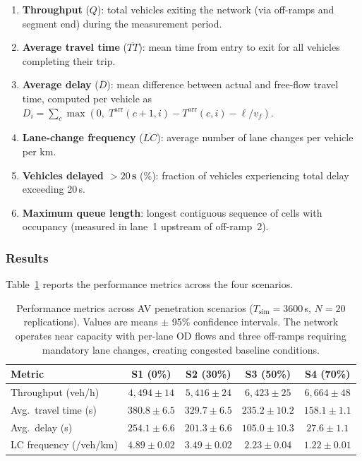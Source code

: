 \documentclass[review,authoryear]{elsarticle}
\newcommand{\Tarr}{T^{\text{arr}}}
\begin{document}
\begin{enumerate}
    \item \textbf{Throughput} ($Q$): total vehicles exiting the network (via off-ramps and segment end) during the measurement period.
    \item \textbf{Average travel time} ($\overline{TT}$): mean time from entry to exit for all vehicles completing their trip.
    \item \textbf{Average delay} ($\overline{D}$): mean difference between actual and free-flow travel time, computed per vehicle as $D_i = \sum_{c} \max(0,\; \Tarr(c+1,i) - \Tarr(c,i) - \ell/v_f)$.
    \item \textbf{Lane-change frequency} ($\overline{LC}$): average number of lane changes per vehicle per km.
    \item \textbf{Vehicles delayed $> 20$\,s} (\%): fraction of vehicles experiencing total delay exceeding 20\,s.
    \item \textbf{Maximum queue length}: longest contiguous sequence of cells with occupancy (measured in lane~1 upstream of off-ramp~2).
\end{enumerate}

\subsubsection{Results}

Table~\ref{tab:results_mixed} reports the performance metrics across the four scenarios.

\begin{table}[ht]
\centering
\caption{Performance metrics across AV penetration scenarios ($T_{\text{sim}} = 3600$\,s, $N = 20$ replications). Values are means $\pm$ 95\% confidence intervals. The network operates near capacity with per-lane OD flows and three off-ramps requiring mandatory lane changes, creating congested baseline conditions.}
\label{tab:results_mixed}
\begin{tabular}{@{}lcccc@{}}
\toprule
Metric & S1 (0\%) & S2 (30\%) & S3 (50\%) & S4 (70\%) \\
\midrule
Throughput (veh/h) & $4{,}494 \pm 14$ & $5{,}416 \pm 24$ & $6{,}423 \pm 25$ & $6{,}664 \pm 48$ \\
Avg.\ travel time (s) & $380.8 \pm 6.5$ & $329.7 \pm 6.5$ & $235.2 \pm 10.2$ & $158.1 \pm 1.1$ \\
Avg.\ delay (s) & $254.1 \pm 6.6$ & $201.3 \pm 6.6$ & $105.0 \pm 10.3$ & $27.6 \pm 1.1$ \\
LC frequency (/veh/km) & $4.89 \pm 0.02$ & $3.49 \pm 0.02$ & $2.23 \pm 0.04$ & $1.22 \pm 0.01$ \\
\bottomrule
\end{tabular}
\end{table}
\end{document}
